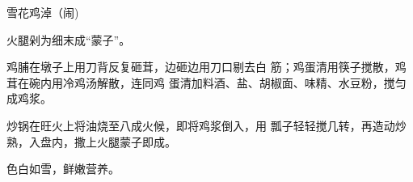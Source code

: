 \begin{recipe}{雪花鸡淖（闹)}

\ingredients



\cooking

\step 火腿剁为细末成“蒙子”。

\step 鸡脯在墩子上用刀背反复砸茸，边砸边用刀口剔去白 筋；鸡蛋清用筷子搅散，鸡茸在碗内用冷鸡汤解散，连同鸡 蛋清加料酒、盐、胡椒面、味精、水豆粉，搅匀成鸡浆。

\step 炒锅在旺火上将油烧至八成火候，即将鸡浆倒入，用 瓢子轻轻搅几转，再造动炒熟，入盘内，撒上火腿蒙子即成。

\notes

色白如雪，鲜嫩营养。

\end{recipe}

